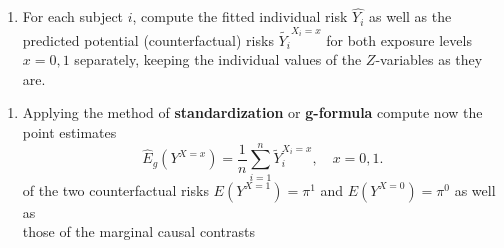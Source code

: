 \documentclass[
]{book}
\newenvironment{Shaded}{\begin{snugshade}}{\end{snugshade}}
\newcommand{\AttributeTok}[1]{\textcolor[rgb]{0.13,0.29,0.53}{#1}}
\newcommand{\CommentTok}[1]{\textcolor[rgb]{0.56,0.35,0.01}{\textit{#1}}}
\newcommand{\DecValTok}[1]{\textcolor[rgb]{0.00,0.00,0.81}{#1}}
\newcommand{\FunctionTok}[1]{\textcolor[rgb]{0.13,0.29,0.53}{\textbf{#1}}}
\newcommand{\NormalTok}[1]{#1}
\newcommand{\OtherTok}[1]{\textcolor[rgb]{0.56,0.35,0.01}{#1}}
\newcommand{\SpecialCharTok}[1]{\textcolor[rgb]{0.81,0.36,0.00}{\textbf{#1}}}
\newcommand{\StringTok}[1]{\textcolor[rgb]{0.31,0.60,0.02}{#1}}
\providecommand{\tightlist}{%
  \setlength{\itemsep}{0pt}\setlength{\parskip}{0pt}}
\begin{document}
\begin{enumerate}
\def\labelenumi{\arabic{enumi}.}
\setcounter{enumi}{1}
\tightlist
\item
  For each subject \(i\), compute the fitted individual risk
  \(\widehat{Y_i}\) as well as the predicted potential
  (counterfactual) risks
  \(\widetilde{Y_i}^{X_i=x}\) for both exposure levels \(x=0,1\)
  separately, keeping the individual values of the
  \(Z\)-variables as they are.
\end{enumerate}

\begin{Shaded}
\end{Shaded}

\begin{enumerate}
\def\labelenumi{\arabic{enumi}.}
\setcounter{enumi}{2}
\tightlist
\item
  Applying the method of \textbf{standardization} or
  \textbf{g-formula} compute now the
  point estimates
  \[ \widehat{E}_g(Y^{X=x}) =
   \frac{1}{n} \sum_{i=1}^n \widetilde{Y}_i^{X_i=x}, \quad x=0,1. \]
  of the two counterfactual risks \(E(Y^{X=1}) = \pi^1\) and
  \(E(Y^{X=0})=\pi^0\) as well as\\
  those of the marginal causal contrasts
\end{enumerate}
\end{document}
